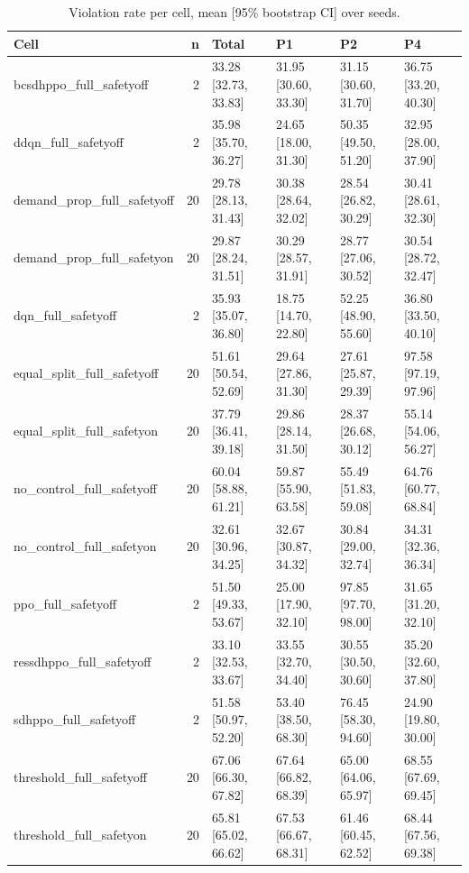 \begin{table}[t]
\centering
\footnotesize
\caption{Violation rate per cell, mean [95\% bootstrap CI] over seeds.}
\label{tab:cells_v2}
\begin{tabular}{lrllll}
\toprule
Cell & n & Total & P1 & P2 & P4 \\
\midrule
bcsdhppo\_full\_safetyoff & 2 & 33.28 [32.73, 33.83] & 31.95 [30.60, 33.30] & 31.15 [30.60, 31.70] & 36.75 [33.20, 40.30] \\
ddqn\_full\_safetyoff & 2 & 35.98 [35.70, 36.27] & 24.65 [18.00, 31.30] & 50.35 [49.50, 51.20] & 32.95 [28.00, 37.90] \\
demand\_prop\_full\_safetyoff & 20 & 29.78 [28.13, 31.43] & 30.38 [28.64, 32.02] & 28.54 [26.82, 30.29] & 30.41 [28.61, 32.30] \\
demand\_prop\_full\_safetyon & 20 & 29.87 [28.24, 31.51] & 30.29 [28.57, 31.91] & 28.77 [27.06, 30.52] & 30.54 [28.72, 32.47] \\
dqn\_full\_safetyoff & 2 & 35.93 [35.07, 36.80] & 18.75 [14.70, 22.80] & 52.25 [48.90, 55.60] & 36.80 [33.50, 40.10] \\
equal\_split\_full\_safetyoff & 20 & 51.61 [50.54, 52.69] & 29.64 [27.86, 31.30] & 27.61 [25.87, 29.39] & 97.58 [97.19, 97.96] \\
equal\_split\_full\_safetyon & 20 & 37.79 [36.41, 39.18] & 29.86 [28.14, 31.50] & 28.37 [26.68, 30.12] & 55.14 [54.06, 56.27] \\
no\_control\_full\_safetyoff & 20 & 60.04 [58.88, 61.21] & 59.87 [55.90, 63.58] & 55.49 [51.83, 59.08] & 64.76 [60.77, 68.84] \\
no\_control\_full\_safetyon & 20 & 32.61 [30.96, 34.25] & 32.67 [30.87, 34.32] & 30.84 [29.00, 32.74] & 34.31 [32.36, 36.34] \\
ppo\_full\_safetyoff & 2 & 51.50 [49.33, 53.67] & 25.00 [17.90, 32.10] & 97.85 [97.70, 98.00] & 31.65 [31.20, 32.10] \\
ressdhppo\_full\_safetyoff & 2 & 33.10 [32.53, 33.67] & 33.55 [32.70, 34.40] & 30.55 [30.50, 30.60] & 35.20 [32.60, 37.80] \\
sdhppo\_full\_safetyoff & 2 & 51.58 [50.97, 52.20] & 53.40 [38.50, 68.30] & 76.45 [58.30, 94.60] & 24.90 [19.80, 30.00] \\
threshold\_full\_safetyoff & 20 & 67.06 [66.30, 67.82] & 67.64 [66.82, 68.39] & 65.00 [64.06, 65.97] & 68.55 [67.69, 69.45] \\
threshold\_full\_safetyon & 20 & 65.81 [65.02, 66.62] & 67.53 [66.67, 68.31] & 61.46 [60.45, 62.52] & 68.44 [67.56, 69.38] \\
\bottomrule
\end{tabular}
\end{table}